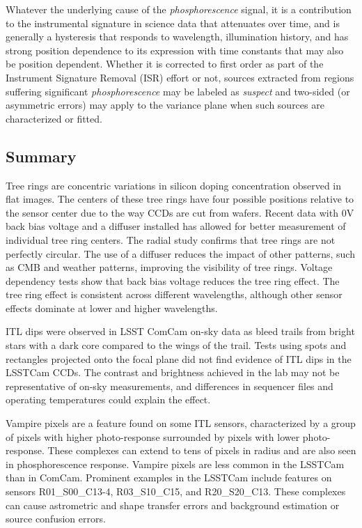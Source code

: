 Whatever the underlying cause of the {\it phosphorescence} signal, it is a contribution to the instrumental signature in science data that attenuates over time, and is generally a hysteresis that responds to wavelength, illumination history, and has strong position dependence to its expression with time constants that may also be position dependent. Whether it is corrected to first order as part of the Instrument Signature Removal (ISR) effort or not, sources extracted from regions suffering significant {\it phosphorescence} may be labeled as {\it suspect} and two-sided (or asymmetric errors) may apply to the variance plane when such sources are characterized or fitted.  

\clearpage

\subsection{Summary}
Tree rings are concentric variations in silicon doping concentration observed in flat images. The centers of these tree rings have four possible positions relative to the sensor center due to the way CCDs are cut from wafers. Recent data with 0V back bias voltage and a diffuser installed has allowed for better measurement of individual tree ring centers. The radial study confirms that tree rings are not perfectly circular. The use of a diffuser reduces the impact of other patterns, such as CMB and weather patterns, improving the visibility of tree rings. Voltage dependency tests show that back bias voltage reduces the tree ring effect. The tree ring effect is consistent across different wavelengths, although other sensor effects dominate at lower and higher wavelengths.

ITL dips were observed in LSST ComCam on-sky data as bleed trails from bright stars with a dark core compared to the wings of the trail. Tests using spots and rectangles projected onto the focal plane did not find evidence of ITL dips in the LSSTCam CCDs. The contrast and brightness achieved in the lab may not be representative of on-sky measurements, and differences in sequencer files and operating temperatures could explain the effect.

Vampire pixels are a feature found on some ITL sensors, characterized by a group of pixels with higher photo-response surrounded by pixels with lower photo-response. These complexes can extend to tens of pixels in radius and are also seen in phosphorescence response. Vampire pixels are less common in the LSSTCam than in ComCam. Prominent examples in the LSSTCam include features on sensors R01\_S00\_C13-4, R03\_S10\_C15, and R20\_S20\_C13. These complexes can cause astrometric and shape transfer errors and background estimation or source confusion errors.

